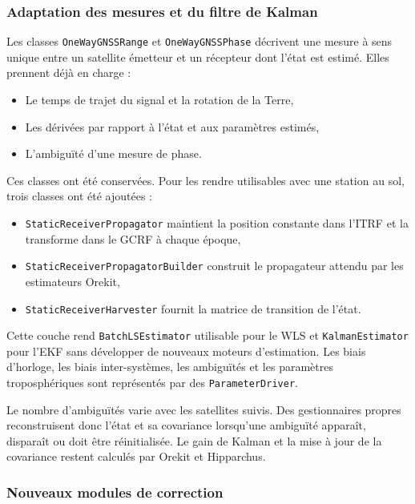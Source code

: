 \subsubsection{Adaptation des mesures et du filtre de Kalman}

Les classes \texttt{OneWayGNSSRange} et \texttt{OneWayGNSSPhase} décrivent une
mesure à sens unique entre un satellite émetteur et un récepteur dont l'état
est estimé. Elles prennent déjà en charge :

\begin{itemize}
    \item Le temps de trajet du signal et la rotation de la Terre,
    \item Les dérivées par rapport à l'état et aux paramètres estimés,
    \item L'ambiguïté d'une mesure de phase.
\end{itemize}

Ces classes ont été conservées. Pour les rendre utilisables avec une station
au sol, trois classes ont été ajoutées :

\begin{itemize}
    \item \texttt{StaticReceiverPropagator} maintient la position constante
    dans l'ITRF et la transforme dans le GCRF à chaque époque,
    \item \texttt{StaticReceiverPropagatorBuilder} construit le propagateur
    attendu par les estimateurs Orekit,
    \item \texttt{StaticReceiverHarvester} fournit la matrice de transition de
    l'état.
\end{itemize}

Cette couche rend \texttt{BatchLSEstimator} utilisable pour le WLS et
\texttt{KalmanEstimator} pour l'EKF sans développer de nouveaux moteurs d'estimation. Les
biais d'horloge, les biais inter-systèmes, les ambiguïtés et les paramètres
troposphériques sont représentés par des \texttt{ParameterDriver}.

Le nombre d'ambiguïtés varie avec les satellites suivis. Des gestionnaires
propres reconstruisent donc l'état et sa covariance lorsqu'une ambiguïté
apparaît, disparaît ou doit être réinitialisée. Le gain de Kalman et la mise à
jour de la covariance restent calculés par Orekit et Hipparchus.

\subsubsection{Nouveaux modules de correction}

